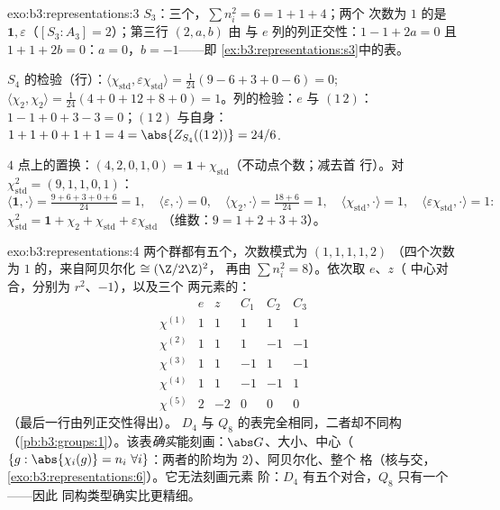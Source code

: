 \begin{solution}{exo:b3:representations:3}
$S_3$：三个，$\sum n_i^2 = 6 = 1 + 1 + 4$；两个
次数为 $1$ 的是 $\mathbf 1, \varepsilon$（$[S_3 :
A_3] = 2$）；第三行 $(2, a, b)$ 由
与 $e$ 列的列正交性：$1 - 1 + 2a = 0$ 且 $1 + 1 +
2b = 0$：$a = 0$，$b = -1$——即
\cref{ex:b3:representations:s3}中的表。

$S_4$ 的检验（行）：$\langle\chi_{\mathrm{std}},
\varepsilon\chi_{\mathrm{std}}\rangle = \frac1{24}(9 - 6 + 3 + 0
- 6) = 0$; $\langle\chi_2,\chi_2\rangle = \frac1{24}(4 + 0 + 12
+ 8 + 0) = 1$。列的检验：$e$ 与 $(1\,2)$：$1 - 1 + 0 + 3 - 3
= 0$；$(1\,2)$ 与自身：$1 + 1 + 0 + 1 + 1 = 4 =
\abs{Z_{S_4}((1\,2))} = 24/6$.

$4$ 点上的置换：$(4, 2, 0, 1, 0) = \mathbf
1 + \chi_{\mathrm{std}}$（不动点个数；减去首
行）。对 $\chi_{\mathrm{std}}^2 = (9, 1, 1, 0, 1)$：
\[
\langle\mathbf1,\cdot\rangle = \tfrac{9 + 6 + 3 + 0 + 6}{24} =
1,\quad
\langle\varepsilon,\cdot\rangle = 0,\quad
\langle\chi_2,\cdot\rangle = \tfrac{18 + 6}{24} = 1,\quad
\langle\chi_{\mathrm{std}},\cdot\rangle = 1,\quad
\langle\varepsilon\chi_{\mathrm{std}},\cdot\rangle = 1:
\]
$\chi_{\mathrm{std}}^2 = \mathbf 1 + \chi_2 +
\chi_{\mathrm{std}} + \varepsilon\chi_{\mathrm{std}}$
（维数：$9 = 1 + 2 + 3 + 3$）。
\end{solution}

\begin{solution}{exo:b3:representations:4}
两个群都有五个，次数模式为 $(1,1,1,1,2)$
（四个次数为 $1$ 的，来自阿贝尔化 $\cong (\Z/2\Z)^2$，
再由 $\sum n_i^2 = 8$）。依次取 $e$、$z$（
中心对合，分别为 $r^2$、$-1$），以及三个
两元素的：
\[
\begin{array}{c|ccccc}
& e & z & C_1 & C_2 & C_3\\
\hline
\chi^{(1)} & 1 & 1 & 1 & 1 & 1\\
\chi^{(2)} & 1 & 1 & 1 & -1 & -1\\
\chi^{(3)} & 1 & 1 & -1 & 1 & -1\\
\chi^{(4)} & 1 & 1 & -1 & -1 & 1\\
\chi^{(5)} & 2 & -2 & 0 & 0 & 0
\end{array}
\]
（最后一行由列正交性得出）。
$D_4$ 与 $Q_8$ 的表完全相同，二者却不同构
（\cref{pb:b3:groups:1}）。该表\emph{确实}能刻画：$\abs
G$、大小、中心（$\{g : \abs{\chi_i(g)} = n_i\
\forall i\}$：两者的阶均为 $2$）、阿贝尔化、整个
格（核与交，
\cref{exo:b3:representations:6}）。它无法刻画元素
阶：$D_4$ 有五个对合，$Q_8$ 只有一个——因此
同构类型确实比更精细。
\end{solution}

